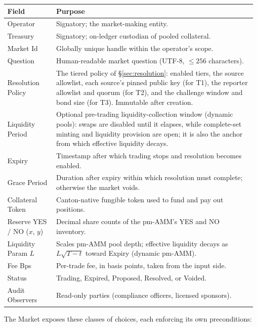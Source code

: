 \documentclass[11pt,a4paper]{article}
\begin{document}
\vspace{0.3em}
\begin{center}
\begin{tabular}{p{3.7cm} p{10.3cm}}
\toprule
\textbf{Field} & \textbf{Purpose} \\
\midrule
Operator & Signatory; the market-making entity. \\
Treasury & Signatory; on-ledger custodian of pooled collateral. \\
Market Id & Globally unique handle within the operator's scope. \\
Question & Human-readable market question (UTF-8, $\leq 256$ characters). \\
Resolution Policy & The tiered policy of \S\ref{sec:resolution}: enabled tiers, the source allowlist, each source's pinned public key (for T1), the reporter allowlist and quorum (for T2), and the challenge window and bond size (for T3). Immutable after creation. \\
Liquidity Period & Optional pre-trading liquidity-collection window (dynamic pools): swaps are disabled until it elapses, while complete-set minting and liquidity provision are open; it is also the anchor from which effective liquidity decays. \\
Expiry & Timestamp after which trading stops and resolution becomes enabled. \\
Grace Period & Duration after expiry within which resolution must complete; otherwise the market voids. \\
Collateral Token & Canton-native fungible token used to fund and pay out positions. \\
Reserve YES / NO ($x$, $y$) & Decimal share counts of the pm-AMM's YES and NO inventory. \\
Liquidity Param $L$ & Scales pm-AMM pool depth; effective liquidity decays as $L\sqrt{T-t}$ toward Expiry (dynamic pm-AMM). \\
Fee Bps & Per-trade fee, in basis points, taken from the input side. \\
Status & Trading, Expired, Proposed, Resolved, or Voided. \\
Audit Observers & Read-only parties (compliance officers, licensed sponsors). \\
\bottomrule
\end{tabular}
\end{center}

The Market exposes these classes of choices, each enforcing its own preconditions:
\end{document}
